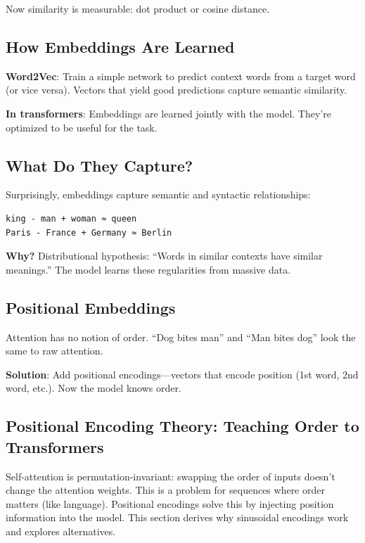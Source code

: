\documentclass[11pt,oneside]{book}
\begin{document}
Now similarity is measurable: dot product or cosine distance.

\subsection{How Embeddings Are Learned}

\textbf{Word2Vec}: Train a simple network to predict context words from a target word (or vice versa). Vectors that yield good predictions capture semantic similarity.

\textbf{In transformers}: Embeddings are learned jointly with the model. They're optimized to be useful for the task.

\subsection{What Do They Capture?}

Surprisingly, embeddings capture semantic and syntactic relationships:

\begin{verbatim}
king - man + woman ≈ queen
Paris - France + Germany ≈ Berlin
\end{verbatim}

\textbf{Why?} Distributional hypothesis: ``Words in similar contexts have similar meanings.'' The model learns these regularities from massive data.

\subsection{Positional Embeddings}

Attention has no notion of order. ``Dog bites man'' and ``Man bites dog'' look the same to raw attention.

\textbf{Solution}: Add positional encodings---vectors that encode position (1st word, 2nd word, etc.). Now the model knows order.

\subsection{Positional Encoding Theory: Teaching Order to Transformers}

Self-attention is permutation-invariant: swapping the order of inputs doesn't change the attention weights. This is a problem for sequences where order matters (like language). Positional encodings solve this by injecting position information into the model. This section derives why sinusoidal encodings work and explores alternatives.
\end{document}
